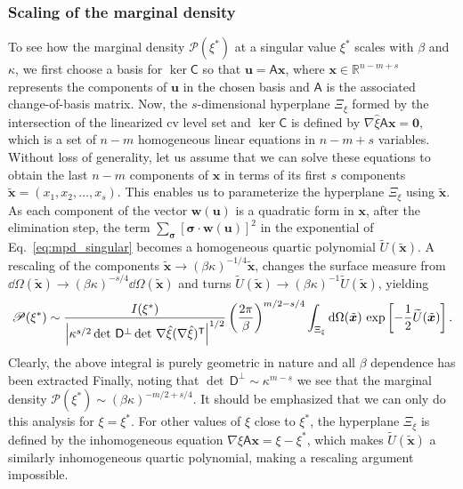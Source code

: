 \subsubsection*{Scaling of the marginal density}
\label{sec:scaling}

To see how the marginal density $\mathscr{P}(\xi^{*})$ at a singular value $\xi^{*}$ scales with $\beta$ and $\kappa$, we first choose a basis for $\ker\mathsf{C}$ so that $\bm{u} = \mathsf{A}\bm{x}$, where $\bm{x} \in \mathbb{R}^{n-m+s}$ represents the components of $\bm{u}$ in the chosen basis and $\mathsf{A}$ is the associated change-of-basis matrix.
Now, the $s$-dimensional hyperplane $\Xi_{\xi}$ formed by the intersection of the linearized \ac{cv} level set and $\ker\mathsf{C}$ is defined by $\nabla\hat{\xi}\mathsf{A}\bm{x} = \bm{0}$, which is a set of $n-m$ homogeneous linear equations in $n-m+s$ variables.
Without loss of generality, let us assume that we can solve these equations to obtain the last $n - m$ components of $\bm{x}$ in terms of its first $s$ components $\tilde{\bm{x}} = (x_{1}, x_{2}, \ldots, x_{s})$.
This enables us to parameterize the hyperplane $\Xi_{\xi}$ using $\tilde{\bm{x}}$.
As each component of the vector $\bm{w}(\bm{u})$ is a quadratic form in $\bm{x}$, after the elimination step, the term $\sum_{\bm{\sigma}}[\bm{\sigma}\cdot\bm{w}(\bm{u})]^{2}$ in the exponential of Eq.~\eqref{eq:mpd_singular} becomes a homogeneous quartic polynomial $\widetilde{U}(\tilde{\bm{x}})$.
A rescaling of the components $\tilde{\bm{x}} \to (\beta\kappa)^{-1/4}\tilde{\bm{x}}$, changes the surface measure from $\dd\Omega(\tilde{\bm{x}}) \to (\beta\kappa)^{-s/4}\dd\Omega(\tilde{\bm{x}})$ and turns $\widetilde{U}(\tilde{\bm{x}}) \to (\beta\kappa)^{-1}\widetilde{U}(\tilde{\bm{x}})$, yielding
%
\begin{equation}
  \mathscr{P}(\xi^{*}) \sim \frac{I({\xi}^{*})}{\left|\kappa^{s/2}\det\,\mathsf{D}^\perp \det\, \nabla\hat{\xi}(\nabla\hat{\xi})^\mathsf{T}\right|^{1/2}}  \left(\frac{2\pi}{\beta}\right)^{m/2 - s/4} \int_{\Xi_{\xi}} \mathrm{d}\Omega(\tilde{\bm{x}})\, \exp\left[-\frac{1}{2}\widetilde{U}(\tilde{\bm{x}})\right].
  \label{eq:scaling}
\end{equation}
%
Clearly, the above integral is purely geometric in nature and all $\beta$ dependence has been extracted
Finally, noting that $\det\,\mathsf{D}^{\perp} \sim \kappa^{m - s}$ we see that the marginal density $\mathscr{P}(\xi^{*}) \sim (\beta\kappa)^{-m/2 + s/4}$.
It should be emphasized that we can only do this analysis for $\xi = \xi^{*}$.
For other values of $\xi$ close to $\xi^{*}$, the hyperplane $\Xi_{\xi}$ is defined by the inhomogeneous equation $\nabla\hat{\xi}\mathsf{A}\bm{x} = \xi - \xi^{*}$, which makes $\widetilde{U}(\tilde{\bm{x}})$ a similarly inhomogeneous quartic polynomial, making a rescaling argument impossible.

